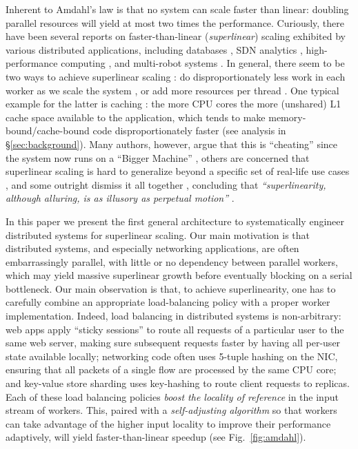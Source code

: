 Inherent to Amdahl's law is that no system can scale faster than linear: doubling parallel resources will yield at most two times the performance. Curiously, there have been several reports on faster-than-linear (\emph{superlinear}) scaling exhibited by various distributed applications, including databases \cite{scalability-analyzed, 10.5555/1012889.1012894}, SDN analytics \cite{sdn-analytitcs}, high-performance computing \cite{556383, 7733347}, and multi-robot systems \cite{10.1007/978-3-319-77610-1}. In general, there seem to be two ways to achieve superlinear scaling \cite{7733347, 80148}: do disproportionately less work in each worker as we scale the system \cite{7733347}, or add more resources per thread \cite{80148}. One typical example for the latter is caching \cite{271208, 10.5555/1012889.1012894}: the more CPU cores the more (unshared) L1 cache space available to the application, which tends to make memory-bound\slash cache-bound code disproportionately faster \cite{80148} (see analysis in \S\ref{sec:background}).  Many authors, however, argue that this is ``cheating'' \cite{gunther-hotsos, 10.1145/2773212.2789974} since the system now runs on a ``Bigger Machine'' \cite{80148}, others are concerned that superlinear scaling is hard to generalize beyond a specific set of real-life use cases \cite{7733347, 80148}, and some outright dismiss it all together \cite{gunther-hotsos, 10.1016/0167-8191(86)90024-4}, concluding that \emph{``superlinearity, although alluring, is as illusory as perpetual motion''} \cite{10.1145/2773212.2789974}.

In this paper we present the first general architecture to systematically engineer distributed systems for superlinear scaling. Our main motivation is that distributed systems, and especially networking applications, are often embarrassingly parallel, with little or no dependency between parallel workers, which may yield massive superlinear growth before eventually blocking on a serial bottleneck.  Our main observation is that, to achieve superlinearity, one has to carefully combine an appropriate load-balancing policy with a proper worker implementation. Indeed, load balancing in distributed systems is non-arbitrary: web apps apply ``sticky sessions'' to route all requests of a particular user to the same web server, making sure subsequent requests faster by having all per-user state available locally; networking code often uses 5-tuple hashing on the NIC, ensuring that all packets of a single flow are processed by the same CPU core; and key-value store sharding uses key-hashing to route client requests to replicas. Each of these load balancing policies \emph{boost the locality of reference} in the input stream of workers. This, paired with a \emph{self-adjusting algorithm} so that workers can take advantage of the higher input locality to improve their performance adaptively, will yield faster-than-linear speedup (see Fig.~\ref{fig:amdahl}). %

